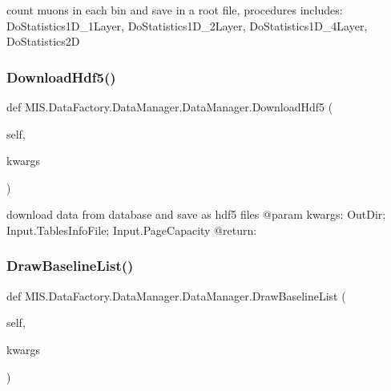 \begin{DoxyVerb}count muons in each bin and save in a root file, procedures includes:
    DoStatistics1D_1Layer, DoStatistics1D_2Layer, DoStatistics1D_4Layer, DoStatistics2D\end{DoxyVerb}
 \mbox{\label{classMIS_1_1DataFactory_1_1DataManager_1_1DataManager_a8fb1b4a388c4c73b8cbde76e1b10659c}} 
\subsubsection{\texorpdfstring{Download\+Hdf5()}{DownloadHdf5()}}
{\footnotesize\ttfamily def M\+I\+S.\+Data\+Factory.\+Data\+Manager.\+Data\+Manager.\+Download\+Hdf5 (\begin{DoxyParamCaption}\item[{}]{self,  }\item[{}]{kwargs }\end{DoxyParamCaption})}

\begin{DoxyVerb}download data from database and save as hdf5 files
@param kwargs: OutDir; Input.TablesInfoFile; Input.PageCapacity
@return:
\end{DoxyVerb}
 \mbox{\label{classMIS_1_1DataFactory_1_1DataManager_1_1DataManager_af16e88fd1cd8676b4eac90887a829a9d}} 
\subsubsection{\texorpdfstring{Draw\+Baseline\+List()}{DrawBaselineList()}}
{\footnotesize\ttfamily def M\+I\+S.\+Data\+Factory.\+Data\+Manager.\+Data\+Manager.\+Draw\+Baseline\+List (\begin{DoxyParamCaption}\item[{}]{self,  }\item[{}]{kwargs }\end{DoxyParamCaption})}

